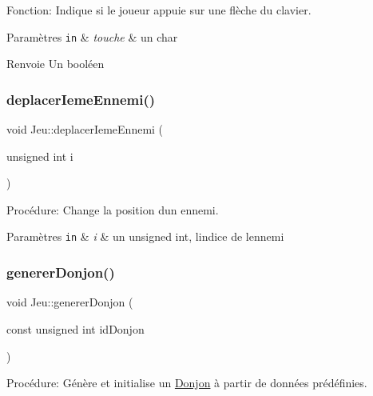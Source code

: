Fonction\+: Indique si le joueur appuie sur une flèche du clavier. 


\begin{DoxyParams}[1]{Paramètres}
\mbox{\tt in}  & {\em touche} & un char \\
\hline
\end{DoxyParams}
\begin{DoxyReturn}{Renvoie}
Un booléen 
\end{DoxyReturn}
\mbox{\label{classJeu_a5638afe1c5fce321b8819461e6e15299}} 
\subsubsection{\texorpdfstring{deplacer\+Ieme\+Ennemi()}{deplacerIemeEnnemi()}}
{\footnotesize\ttfamily void Jeu\+::deplacer\+Ieme\+Ennemi (\begin{DoxyParamCaption}\item[{unsigned int}]{i }\end{DoxyParamCaption})}



Procédure\+: Change la position d\textquotesingle{}un ennemi. 


\begin{DoxyParams}[1]{Paramètres}
\mbox{\tt in}  & {\em i} & un unsigned int, lindice de l\textquotesingle{}ennemi \\
\hline
\end{DoxyParams}
\mbox{\label{classJeu_ad47ce612c294306092ce2e3c726934e3}} 
\subsubsection{\texorpdfstring{generer\+Donjon()}{genererDonjon()}}
{\footnotesize\ttfamily void Jeu\+::generer\+Donjon (\begin{DoxyParamCaption}\item[{const unsigned int}]{id\+Donjon }\end{DoxyParamCaption})}



Procédure\+: Génère et initialise un \mbox{\hyperlink{classDonjon}{Donjon}} à partir de données prédéfinies. 


